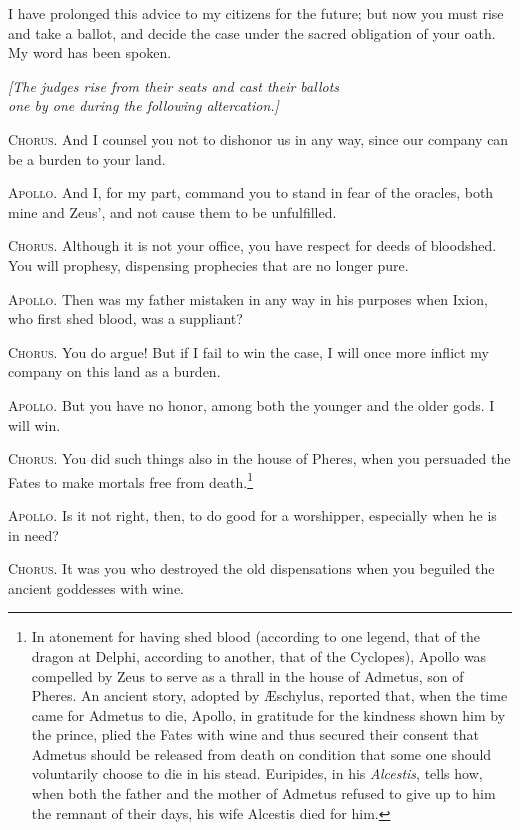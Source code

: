 \documentclass[12pt]{article}
\begin{document}
I have prolonged this advice to my citizens for the future; but now you must rise and take a ballot, and decide the case under the sacred obligation of your oath. My word has been spoken.

\begin{center}
\textit{[The judges rise from their seats and cast their ballots\\
one by one during the following altercation.]}
\end{center}

\textsc{Chorus.} And I counsel you not to dishonor us in any way, since our company can be a burden to your land.

\textsc{Apollo.} And I, for my part, command you to stand in fear of the oracles, both mine and Zeus', and not cause them to be unfulfilled.

\textsc{Chorus.} Although it is not your office, you have respect for deeds of bloodshed. You will prophesy, dispensing prophecies that are no longer pure.

\textsc{Apollo.} Then was my father mistaken in any way in his purposes when Ixion, who first shed blood, was a suppliant?

\textsc{Chorus.} You do argue! But if I fail to win the case, I will once more inflict my company on this land as a burden.

\textsc{Apollo.} But you have no honor, among both the younger and the older gods. I will win.

\textsc{Chorus.} You did such things also in the house of Pheres, when you persuaded the Fates to make mortals free from death.\footnote{In atonement for having shed blood (according to one legend, that of the dragon at Delphi, according to another, that of the Cyclopes), Apollo was compelled by Zeus to serve as a thrall in the house of Admetus, son of Pheres. An ancient story, adopted by {\AE}schylus, reported that, when the time came for Admetus to die, Apollo, in gratitude for the kindness shown him by the prince, plied the Fates with wine and thus secured their consent that Admetus should be released from death on condition that some one should voluntarily choose to die in his stead. Euripides, in his \textit{Alcestis}, tells how, when both the father and the mother of Admetus refused to give up to him the remnant of their days, his wife Alcestis died for him.}

\textsc{Apollo.} Is it not right, then, to do good for a worshipper, especially when he is in need?

\textsc{Chorus.} It was you who destroyed the old dispensations when you beguiled the ancient goddesses with wine.
\end{document}
